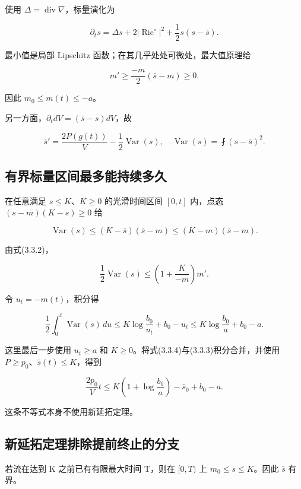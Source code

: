 \documentclass[UTF8,11pt,fontset=none]{ctexart}
\theoremstyle{definition}
\theoremstyle{remark}
\begin{document}
使用 \(\Delta=\operatorname{div}\nabla\)，标量演化为

\[
 \partial_t s=\Delta s+2|\operatorname{Ric}^{\circ}|^2
             +\frac12s(s-\bar s).
\]

最小值是局部 Lipschitz 函数；在其几乎处处可微处，最大值原理给

\[
 m'\ge\frac{-m}{2}(\bar s-m)\ge0.
\tag{3.3.2}
\]

因此 \(m_0\le m(t)\le-a\)。

另一方面，\(\partial_t dV=(\bar s-s)dV\)，故

\[
 \boxed{
 \bar s'=\frac{2P(g(t))}{V}-\frac12\operatorname{Var}(s),
 \quad \operatorname{Var}(s)=\fint(s-\bar s)^2.
 }
\tag{3.3.3}
\]

\subsection{有界标量区间最多能持续多久}\label{v3-ux6709ux754cux6807ux91cfux533aux95f4ux6700ux591aux80fdux6301ux7eedux591aux4e45}

在任意满足 \(s\le K\)、\(K\ge0\) 的光滑时间区间 \([0,t]\) 内，点态 \((s-m)(K-s)\ge0\) 给

\[
 \operatorname{Var}(s)\le(K-\bar s)(\bar s-m)
                      \le(K-m)(\bar s-m).
\]

由式(3.3.2)，

\[
 \frac12\operatorname{Var}(s)
 \le\left(1+\frac{K}{-m}\right)m'.
\]

令 \(u_t=-m(t)\)，积分得

\[
 \frac12\int_0^t\operatorname{Var}(s)\,du
 \le K\log\frac{b_0}{u_t}+b_0-u_t
 \le K\log\frac{b_0}{a}+b_0-a.
\tag{3.3.4}
\]

这里最后一步使用 \(u_t\ge a\) 和 \(K\ge0\)。将式(3.3.4)与(3.3.3)积分合并，并使用 \(P\ge p_0\)、\(\bar s(t)\le K\)，得到

\[
 \boxed{
 \frac{2p_0}{V}t
 \le K\left(1+\log\frac{b_0}{a}\right)-\bar s_0+b_0-a.
 }
\tag{3.3.5}
\]

这条不等式本身不使用新延拓定理。

\subsection{新延拓定理排除提前终止的分支}\label{v3-ux65b0ux5ef6ux62d3ux5b9aux7406ux6392ux9664ux63d0ux524dux7ec8ux6b62ux7684ux5206ux652f}

若流在达到 K 之前已有有限最大时间 T，则在 \([0,T)\) 上 \(m_0\le s\le K\)。因此 \(\bar s\) 有界。
\end{document}
